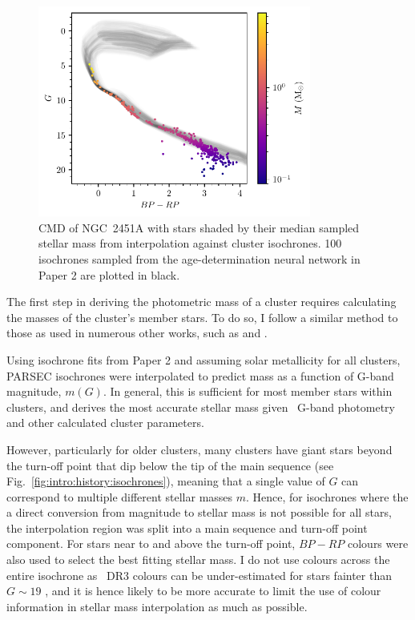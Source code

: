 \begin{figure}[t]
    \centering
    \includegraphics[width=0.8\textwidth]{fig/c4/masses_stellar.pdf}
    \caption[CMD of NGC~2451A with stars shaded by their median sampled stellar mass]{CMD of NGC~2451A with stars shaded by their median sampled stellar mass from interpolation against cluster isochrones. 100 isochrones sampled from the age-determination neural network in Paper 2 are plotted in black.}
    \label{fig:dynamics:masses:stellar_masses}
 \end{figure}

 The first step in deriving the photometric mass of a cluster requires calculating the masses of the cluster's member stars. To do so, I follow a similar method to those as used in numerous other works, such as \cite{meingast_extended_2021} and \cite{cordoni_photometric_binaries_2023}.

Using isochrone fits from Paper 2 and assuming solar metallicity for all clusters, PARSEC isochrones \citep{bressan_parsec_2012} were interpolated to predict mass as a function of G-band magnitude, $m(G)$. In general, this is sufficient for most member stars within clusters, and derives the most accurate stellar mass given \gaia\ G-band photometry and other calculated cluster parameters. 
 
However, particularly for older clusters, many clusters have giant stars beyond the turn-off point that dip below the tip of the main sequence (see Fig.~\ref{fig:intro:history:isochrones}), meaning that a single value of $G$ can correspond to multiple different stellar masses $m$. Hence, for isochrones where the a direct conversion from magnitude to stellar mass is not possible for all stars, the interpolation region was split into a main sequence and turn-off point component. For stars near to and above the turn-off point, $BP-RP$ colours were also used to select the best fitting stellar mass. I do not use colours across the entire isochrone as \gaia\ DR3 colours can be under-estimated for stars fainter than $G\sim19$ \citep[especially in the BP band,][]{riello_gaia_2021}, and it is hence likely to be more accurate to limit the use of colour information in stellar mass interpolation as much as possible.


